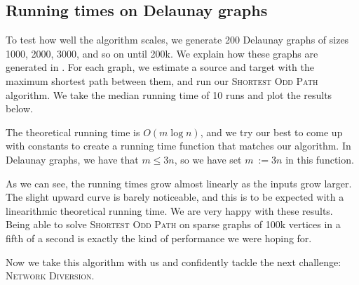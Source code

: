 \subsection{Running times on Delaunay graphs}
\label{subsubsection:odd-path-delaunay-testing}
To test how well the algorithm scales, we generate 200 Delaunay graphs of sizes 1000, 2000, 3000, and so on until 200k. We explain how these graphs are generated in . For each graph, we estimate a source and target with the maximum shortest path between them, and run our \textsc{Shortest Odd Path} algorithm. We take the median running time of 10 runs and plot the results below.

The theoretical running time is $O(m \log n)$, and we try our best to come up with constants to create a running time function that matches our algorithm. In Delaunay graphs, we have that $m \leq 3n$, so we have set $m~:= 3n$ in this function.

\begin{center}
    
\end{center}

As we can see, the running times grow almost linearly as the inputs grow larger. The slight upward curve is barely noticeable, and this is to be expected with a linearithmic theoretical running time. We are very happy with these results. Being able to solve \textsc{Shortest Odd Path} on sparse graphs of 100k vertices in a fifth of a second is exactly the kind of performance we were hoping for. 

Now we take this algorithm with us and confidently tackle the next challenge: \textsc{Network Diversion}.
